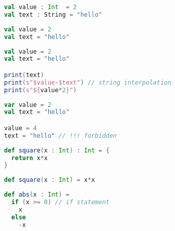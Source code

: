 \documentclass[10pt]{beamer}
\begin{document}
\begin{frame}[fragile]
\begin{lstlisting}[language=Scala, basicstyle=\ttfamily]
val value : Int  = 2
val text : String = "hello" 
\end{lstlisting}
\end{frame}

\begin{frame}[fragile]
\begin{lstlisting}[language=Scala, basicstyle=\ttfamily]
val value = 2
val text = "hello" 
\end{lstlisting}
\end{frame}

\begin{frame}[fragile]
\begin{lstlisting}[language=Scala, basicstyle=\ttfamily]
val value = 2
val text = "hello"

print(text)
print(s"$value-$text") // string interpolation 
print(s"${value*2}")
\end{lstlisting}
\end{frame}

\begin{frame}[fragile]
\begin{lstlisting}[language=Scala, basicstyle=\ttfamily]
var value = 2
val text = "hello" 

value = 4
text = "hello" // !!! forbidden 
\end{lstlisting}
\end{frame}

\begin{frame}[fragile]
\begin{lstlisting}[language=Scala, basicstyle=\ttfamily]
def square(x : Int) : Int = {
  return x*x
}
\end{lstlisting}
\end{frame}

\begin{frame}[fragile]
\begin{lstlisting}[language=Scala, basicstyle=\ttfamily]
def square(x : Int) = x*x
\end{lstlisting}
\end{frame}

\begin{frame}[fragile]
\begin{lstlisting}[language=Scala, basicstyle=\ttfamily]
def abs(x : Int) =
  if (x >= 0) // if statement 
    x 
  else 
    -x  
\end{lstlisting}
\end{frame}
\end{document}
